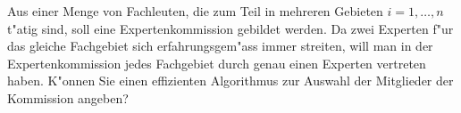 Aus einer Menge von Fachleuten, die zum Teil in mehreren Gebieten
$i=1,\dots,n$ t"atig sind, soll eine Expertenkommission gebildet werden.
Da zwei Experten f"ur das gleiche Fachgebiet sich erfahrungsgem"ass
immer streiten, will man in der Expertenkommission jedes Fachgebiet
durch genau einen Experten vertreten haben. K"onnen Sie einen effizienten
Algorithmus zur Auswahl der Mitglieder der Kommission angeben?



